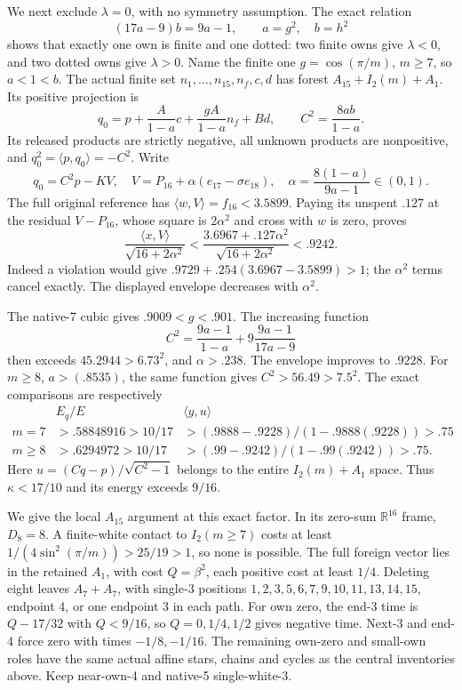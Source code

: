 \documentclass[11pt]{article}
\theoremstyle{definition}
\theoremstyle{remark}
\newcommand{\ip}[2]{\langle #1,#2\rangle}
\begin{document}
We next exclude \(\lambda=0\), with no symmetry assumption.
The exact relation
\[
 (17a-9)b=9a-1,\qquad a=g^2,\quad b=h^2
\]
shows that exactly one own is finite and one dotted: two finite
owns give \(\lambda<0\), and two dotted owns give \(\lambda>0\).
Name the finite one \(g=\cos(\pi/m)\), \(m\ge7\), so \(a<1<b\).
The actual finite set \(n_1,\ldots,n_{15},n_f,c,d\) has
forest \(A_{15}+I_2(m)+A_1\).
Its positive projection is
\[
 q_0=p+{\frac{A}{1-a}}c+{\frac{gA}{1-a}}n_f+Bd,\qquad
 C^2={\frac{8ab}{1-a}}.
\]
Its released products are strictly negative, all unknown products
are nonpositive, and \(q_0^2=\ip p{q_0}=-C^2\).
Write
\[
 q_0=C^2p-KV,\quad V=P_{16}+\alpha(e_{17}-\sigma e_{18}),
 \quad \alpha={\frac{8(1-a)}{9a-1}}\in(0,1).
\]
The full original reference has
\(\ip wV=f_{16}<3.5899\).
Paying its unspent \(.127\) at the residual \(V-P_{16}\),
whose square is \(2\alpha^2\) and cross with \(w\) is zero,
proves
\[
 {\frac{\ip xV}{\sqrt{16+2\alpha^2}}}
 <{\frac{3.6967+.127\alpha^2}{\sqrt{16+2\alpha^2}}}<.9242.
\]
Indeed a violation would give
\(.9729+.254(3.6967-3.5899)>1\);
the \(\alpha^2\) terms cancel exactly.
The displayed envelope decreases with \(\alpha^2\).

The native-7 cubic gives \(.9009<g<.901\).
The increasing function
\[
 C^2={\frac{9a-1}{1-a}}
          +9{\frac{9a-1}{17a-9}}
\]
then exceeds \(45.2944>6.73^2\), and \(\alpha>.238\).
The envelope improves to \(.9228\).
For \(m\ge8\), \(a>(.8535)\), the same function gives
\(C^2>56.49>7.5^2\).
The exact comparisons are respectively
\[
 \begin{array}{c|c|c}
 &E_q/E&\ip yu\\ \hline
 m=7&>.58848916>10/17&
       >(.9888-.9228)/(1-.9888(.9228))>.75\\
 m\ge8&>.6294972>10/17&
       >(.99-.9242)/(1-.99(.9242))>.75 .
 \end{array}
\]
Here \(u=(Cq-p)/\sqrt{C^2-1}\) belongs to the entire
\(I_2(m)+A_1\) space.  Thus \(\kappa<17/10\) and
its energy exceeds \(9/16\).

We give the local \(A_{15}\) argument at this exact factor.
In its zero-sum \(\mathbb R^{16}\) frame, \(D_8=8\).
A finite-white contact to \(I_2(m\ge7)\) costs at least
\(1/(4\sin^2(\pi/m))>25/19>1\), so none is possible.
The full foreign vector lies in the retained \(A_1\), with cost
\(Q=\beta^2\), each positive cost at least \(1/4\).
Deleting eight leaves \(A_7+A_7\), with single-3 positions
\(1,2,3,5,6,7,9,10,11,13,14,15\), endpoint 4,
or one endpoint 3 in each path.
For own zero, the end-3 time is \(Q-17/32\) with
\(Q<9/16\), so \(Q=0,1/4,1/2\) gives negative time.
Next-3 and end-4 force zero with times \(-1/8,-1/16\).
The remaining own-zero and small-own roles have the same actual
affine stars, chains and cycles as the central inventories above.
Keep near-own-4 and native-5 single-white-3.
\end{document}
